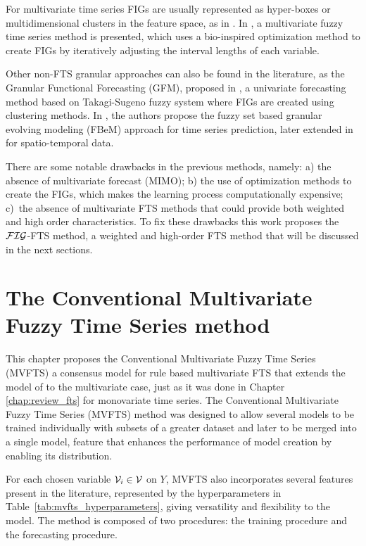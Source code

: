 For multivariate time series FIGs are usually represented as hyper-boxes or multidimensional clusters in the feature space, as in \cite{Reyes-Galaviz2016, Singh2018}.  In \cite{Singh2018},  a multivariate fuzzy time series method is presented, which uses a bio-inspired optimization method to create FIGs by iteratively adjusting the interval lengths of each variable.

Other non-FTS granular approaches can also be found in the literature, as the Granular Functional Forecasting (GFM), proposed in \cite{Magalhaes2008}, a univariate forecasting method based on Takagi-Sugeno fuzzy system where FIGs are created using clustering methods. In \cite{Leite2011}, the authors propose the fuzzy set  based  granular  evolving modeling (FBeM) approach for time series prediction, later extended in \cite{Soares2018} for spatio-temporal data.

There are some notable drawbacks in the previous methods, namely: a) the absence of multivariate forecast (MIMO); b) the use of optimization methods to create the FIGs, which makes the learning process computationally expensive; c)~the absence of multivariate FTS methods that could provide both weighted and high order characteristics. To fix these drawbacks this work proposes the $\FIG$-FTS method, a weighted and high-order FTS method that will be discussed in the next sections. 
\index{$\FIG$}

\section{The Conventional Multivariate Fuzzy Time Series method}
\label{sec:mvfts}

This chapter proposes the Conventional Multivariate Fuzzy Time Series (MVFTS) a consensus model for rule based multivariate FTS that extends the model of \cite{chen1996forecasting} to the multivariate case, just as it was done in Chapter \ref{chap:review_fts} for monovariate time series. The Conventional Multivariate Fuzzy Time Series (MVFTS) method was designed to allow several models to be trained individually with subsets of a greater dataset and later to be merged into a single model, feature that enhances the performance of model creation by enabling its distribution.

For each chosen variable $\mathcal{V}_i \in \mathcal{V}$ on $Y$, MVFTS also incorporates several features present in the literature, represented by the hyperparameters in Table~\ref{tab:mvfts_hyperparameters}, giving versatility and flexibility to the model. The method is composed of two procedures: the training procedure and the forecasting procedure.

